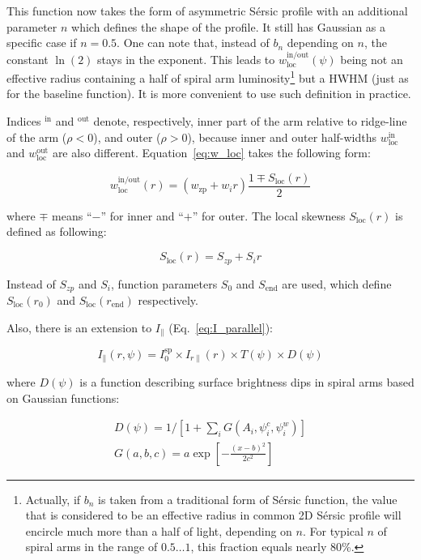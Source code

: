 \documentclass[12pt,a4paper]{article}
\begin{document}
This function now takes the form of asymmetric S{\'e}rsic profile with an additional parameter $n$ which defines the shape of the profile. It still has Gaussian as a specific case if $n = 0.5$. One can note that, instead of $b_n$ depending on $n$, the constant $\ln(2)$ stays in the exponent. This leads to $w_\text{loc}^\text{in/out}(\psi)$ being not an effective radius containing a half of spiral arm luminosity\footnote{Actually, if $b_n$ is taken from a traditional form of S{\'e}rsic function, the value that is considered to be an effective radius in common 2D S{\'e}rsic profile will encircle much more than a half of light, depending on $n$. For typical $n$ of spiral arms in the range of $0.5 \ldots 1$, this fraction equals nearly 80\%.} but a HWHM (just as for the baseline function). It is more convenient to use such definition in practice.

Indices $^\text{in}$ and $^\text{out}$ denote, respectively, inner part of the arm relative to ridge-line of the arm ($\rho < 0$), and outer ($\rho > 0$), because inner and outer half-widths $w_\text{loc}^\text{in}$ and $w_\text{loc}^\text{out}$ are also different. Equation~\ref{eq:w_loc} takes the following form:

\begin{equation}
	w^\text{in/out}_\text{loc}(r) = (w_\text{zp} + w_i r) \frac{1 \mp S_\text{loc}(r)}{2}
\end{equation}

where $\mp$ means ``$-$'' for inner and ``$+$'' for outer. The local skewness $S_\text{loc}(r)$ is defined as following:

\begin{equation}
	S_\text{loc}(r) = S_{zp} + S_i r
\end{equation}

Instead of $S_{zp}$ and $S_i$, function parameters $S_0$ and $S_\text{end}$ are used, which define $S_\text{loc}(r_0)$ and $S_\text{loc}(r_\text{end})$ respectively.

Also, there is an extension to $I_\parallel$ (Eq.~\ref{eq:I_parallel}):

\begin{equation}
	I_\parallel(r, \psi) = I^\text{sp}_0 \times I_{r \parallel}(r) \times T(\psi) \times D(\psi)
\end{equation}

where $D(\psi)$ is a function describing surface brightness dips in spiral arms based on Gaussian functions:

\begin{equation}
	\begin{array}{ll}
		D(\psi) = 1 / [1 + \sum_i G(A_i, \psi_i^c, \psi_i^w)]\\
		G(a, b, c) = a \exp\left[-\frac{(x - b)^2}{2c^2}\right]
	\end{array}
\end{equation}
\end{document}
